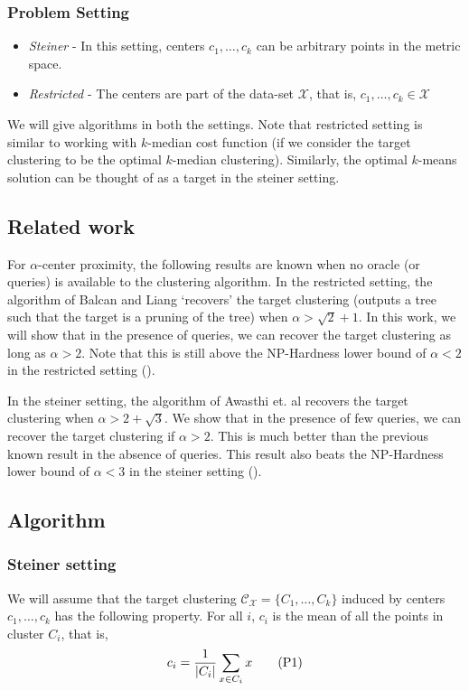 \documentclass[11pt]{article}
\newcommand{\mc}{\mathcal}
\begin{document}
\subsubsection*{Problem Setting}
\begin{itemize}[nolistsep, noitemsep]
\item {\it Steiner} - In this setting, centers $c_1, \ldots, c_k$ can be arbitrary points in the metric space.
\item {\it Restricted} - The centers are part of the data-set $\mc X$, that is, $c_1, \ldots, c_k \in \mc X$ \\
\end{itemize}
We will give algorithms in both the settings. Note that restricted setting is similar to working with $k$-median cost function (if we consider the target clustering to be the optimal $k$-median clustering). Similarly, the optimal $k$-means solution can be thought of as a target in the steiner setting.

\subsection{Related work}
For $\alpha$-center proximity, the following results are known when no oracle (or queries) is available to the clustering algorithm. In the restricted setting, the algorithm of Balcan and Liang \cite{balcan2012clustering} `recovers' the target clustering (outputs a tree such that the target is a pruning of the tree) when $\alpha > \sqrt{2} + 1$. In this work, we will show that in the presence of queries, we can recover the target clustering as long as $\alpha > 2$. Note that this is still above the NP-Hardness lower bound of $\alpha < 2$ in the restricted setting (\cite{ben2014data}).

In the steiner setting, the algorithm of Awasthi et. al \cite{awasthi2012center} recovers the target clustering when $\alpha > 2+\sqrt{3}$. We show that in the presence of few queries, we can recover the target clustering if $\alpha > 2$. This is much better than the previous known result in the absence of queries. This result also beats the NP-Hardness lower bound of $\alpha < 3$ in the steiner setting (\cite{awasthi2012center}).

\subsection{Algorithm}
\subsubsection*{Steiner setting}
We will assume that the target clustering $\mc C_{\mc X} = \{C_1, \ldots, C_k\}$ induced by centers $c_1, \ldots, c_k$ has the following property. For all $i$, $c_i$ is the mean of all the points in cluster $C_i$, that is,
\begin{align}
c_i = \frac{1}{|C_i|}\sum_{x \in C_i} x \stepcounter{equation}\tag{P\theequation} \label{property:targetClust}
\end{align}
\end{document}

